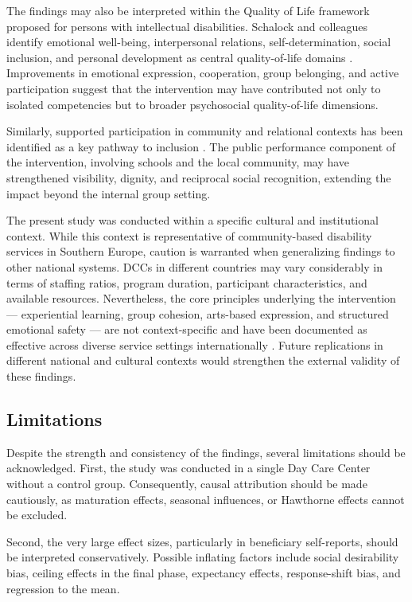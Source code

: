 \documentclass[12pt,a4paper]{article}
\begin{document}
The findings may also be interpreted within the Quality of Life framework proposed for persons with intellectual disabilities. Schalock and colleagues identify emotional well-being, interpersonal relations, self-determination, social inclusion, and personal development as central quality-of-life domains \citep{schalock2010}. Improvements in emotional expression, cooperation, group belonging, and active participation suggest that the intervention may have contributed not only to isolated competencies but to broader psychosocial quality-of-life dimensions.

Similarly, supported participation in community and relational contexts has been identified as a key pathway to inclusion \citep{bigby2015}. The public performance component of the intervention, involving schools and the local community, may have strengthened visibility, dignity, and reciprocal social recognition, extending the impact beyond the internal group setting.

The present study was conducted within a specific cultural and
institutional context. While this context is representative of
community-based disability services in Southern Europe, caution
is warranted when generalizing findings to other national systems.
DCCs in different countries may vary considerably in terms of
staffing ratios, program duration, participant characteristics,
and available resources. Nevertheless, the core principles underlying
the intervention --- experiential learning, group cohesion,
arts-based expression, and structured emotional safety --- are not
context-specific and have been documented as effective across diverse
service settings internationally \citep{giummarra2022,leavy2015}.
Future replications in different national and cultural contexts
would strengthen the external validity of these findings.

\subsection{Limitations}

Despite the strength and consistency of the findings, several limitations should be acknowledged. First, the study was conducted in a single Day Care Center without a control group. Consequently, causal attribution should be made cautiously, as maturation effects, seasonal influences, or Hawthorne effects cannot be excluded.

Second, the very large effect sizes, particularly in beneficiary self-reports, should be interpreted conservatively. Possible inflating factors include social desirability bias, ceiling effects in the final phase, expectancy effects, response-shift bias, and regression to the mean.
\end{document}
